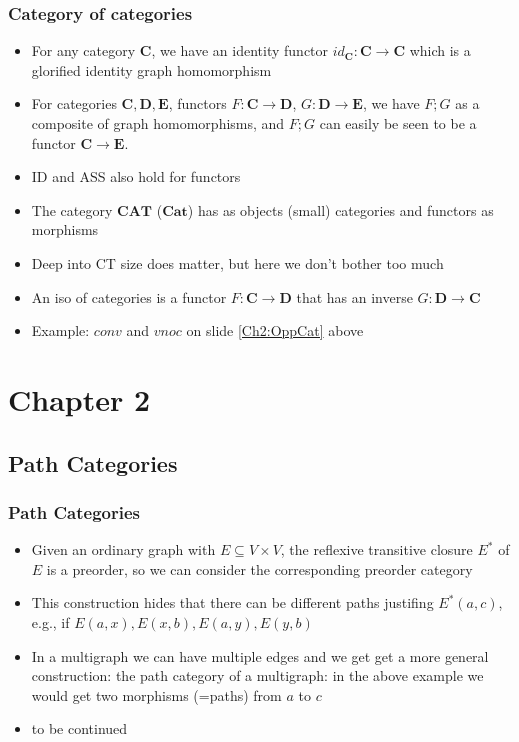 \documentclass[handout]{beamer}
\newcommand{\bfsf}[1]{{\boldsymbol{#1}}}
\newcommand{\CC}{\bfsf{C}}
\newcommand{\DD}{\bfsf{D}}
\newcommand{\EE}{\bfsf{E}}
\newcommand{\Cat}{\bfsf{Cat}}
\newcommand{\CAT}{\bfsf{CAT}}
\begin{document}
\frame
  {   
    \frametitle{Category of categories}\label{Ch2:CatofCats}

 \begin{itemize}[<+->]
\item For any category $\CC$, we have an identity functor $id_\CC : \CC\to\CC$ 
which is a glorified identity graph homomorphism
\item For categories $\CC,\DD,\EE$, functors $F:\CC\to\DD$, $G:\DD\to\EE$,
we have $F;G$ as a composite of graph homomorphisms, and $F;G$ can easily
be seen to be a functor $\CC\to\EE$.
\item ID and ASS also hold for functors
\item The category $\CAT$ ($\Cat$) has as objects (small) categories
and functors as morphisms
\item Deep into CT size does matter, but here we don't bother too much 
\item An iso of categories is a functor $F: \CC\to\DD$ that has an inverse $G:\DD\to\CC$
\item Example: $conv$ and $vnoc$ on slide \ref{Ch2:OppCat} above
 \end{itemize}

 }

\section{Chapter 2}
\subsection{Path Categories}

\frame
  {   
    \frametitle{Path Categories}\label{Ch2:PathCats}

 \begin{itemize}[<+->]
\item Given an ordinary graph with $E\subseteq V\times V$, the
reflexive transitive closure $E^*$ of $E$ is a preorder,
so we can consider the corresponding preorder category
\item This construction hides that there can be different paths
justifing $E^*(a,c)$, e.g., if $E(a,x), E(x,b), E(a,y), E(y,b)$
\item In a multigraph we can have multiple edges and we get
get a more general construction: the path category of a multigraph:
in the above example we would get two morphisms (=paths) from $a$ to $c$
\item to be continued
 \end{itemize}

 }
\end{document}
